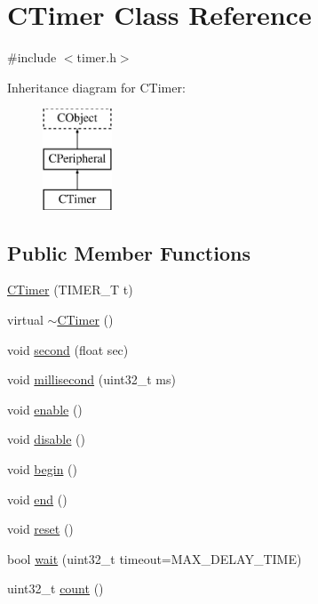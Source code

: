 \hypertarget{class_c_timer}{\section{C\-Timer Class Reference}
\label{class_c_timer}
}


{\ttfamily \#include $<$timer.\-h$>$}

Inheritance diagram for C\-Timer\-:\begin{figure}[H]
\begin{center}
\leavevmode
\includegraphics[height=3.000000cm]{db/de1/class_c_timer}
\end{center}
\end{figure}
\subsection*{Public Member Functions}
\begin{DoxyCompactItemize}
\item 
\hyperlink{class_c_timer_a01988907cb23d887bf9db237ecac1d8f}{C\-Timer} (T\-I\-M\-E\-R\-\_\-\-T t)
\item 
virtual \hyperlink{class_c_timer_a9482f3b89043986caeb6136df6d4fd08}{$\sim$\-C\-Timer} ()
\item 
void \hyperlink{class_c_timer_aa4d48f568d057eccc1842748034fadbf}{second} (float sec)
\item 
void \hyperlink{class_c_timer_a80328fea91b61d9ffb154671b5cae6df}{millisecond} (uint32\-\_\-t ms)
\item 
void \hyperlink{class_c_timer_aeffc80e8f34a8c1e5e0850da92b7ee17}{enable} ()
\item 
void \hyperlink{class_c_timer_a61c79a568b4337520ed58e5f248a068e}{disable} ()
\item 
void \hyperlink{class_c_timer_ab94e07fab4cea184d1b02de1c9435b02}{begin} ()
\item 
void \hyperlink{class_c_timer_a7258888c2b3954fa3922201595e562a8}{end} ()
\item 
void \hyperlink{class_c_timer_a6234aac53e301116247e33254cd2f585}{reset} ()
\item 
bool \hyperlink{class_c_timer_a9e63f073da87bd67b2afded332d2aa2d}{wait} (uint32\-\_\-t timeout=M\-A\-X\-\_\-\-D\-E\-L\-A\-Y\-\_\-\-T\-I\-M\-E)
\item 
uint32\-\_\-t \hyperlink{class_c_timer_a54ec6171b2f4f7af4fd5f3b43a486d02}{count} ()
\end{DoxyCompactItemize}
